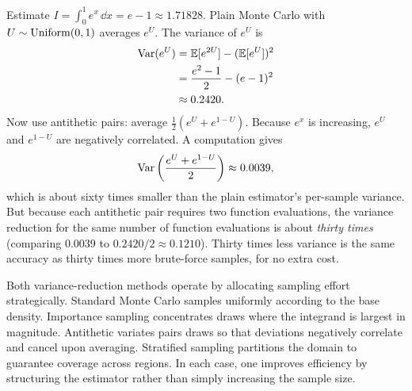 \begin{example}
\label{ch35:ex-antithetic}
Estimate $I = \int_0^1 e^x\,\dd x = e - 1 \approx 1.71828$. Plain Monte Carlo with
$U\sim\operatorname{Uniform}(0,1)$ averages $e^U$. The variance of $e^U$ is
\begin{align*}
  \operatorname{Var}(e^U) &= \operatorname{\mathbb{E}}[e^{2U}] - (\operatorname{\mathbb{E}}[e^U])^2 \\
  &= \frac{e^2-1}{2} - (e-1)^2 \\
  &\approx 0.2420.
\end{align*}
Now use antithetic pairs: average $\frac{1}{2}(e^U + e^{1-U})$. Because $e^x$ is
increasing, $e^U$ and $e^{1-U}$ are negatively correlated. A computation gives
\[
  \operatorname{Var}\left(\frac{e^U+e^{1-U}}{2}\right) \approx 0.0039,
\]
which is about sixty times smaller than the plain estimator's per-sample variance. But because each antithetic
pair requires two function evaluations, the variance reduction for the same number
of function evaluations is about \emph{thirty times} (comparing $0.0039$ to $0.2420/2 \approx 0.1210$).
Thirty times less variance is the same accuracy as thirty times more brute-force samples,
for no extra cost.
\end{example}
\begin{happeningbox}
Both variance-reduction methods operate by allocating sampling effort strategically.
Standard Monte Carlo samples uniformly according to the base density. Importance sampling
concentrates draws where the integrand is largest in magnitude. Antithetic variates pairs draws
so that deviations negatively correlate and cancel upon averaging. Stratified sampling
partitions the domain to guarantee coverage across regions. In each case, one improves
efficiency by structuring the estimator rather than simply increasing the sample size.
\end{happeningbox}
